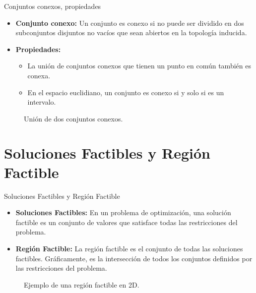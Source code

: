 \documentclass{beamer}
\begin{document}
\begin{frame}{Conjuntos conexos, propiedades}
    \begin{itemize}
        \item \textbf{Conjunto conexo:} Un conjunto es conexo si no puede ser dividido en dos subconjuntos disjuntos no vacíos que sean abiertos en la topología inducida.
        \item \textbf{Propiedades:}
        \begin{itemize}
            \item La unión de conjuntos conexos que tienen un punto en común también es conexa.
            \item En el espacio euclidiano, un conjunto es conexo si y solo si es un intervalo.
        \end{itemize}
    \end{itemize}
    
    \begin{figure}
        \centering
        \caption{Unión de dos conjuntos conexos.}
    \end{figure}
\end{frame}

\section{Soluciones Factibles y Región Factible}

\begin{frame}{Soluciones Factibles y Región Factible}
    \begin{itemize}
        \item \textbf{Soluciones Factibles:} En un problema de optimización, una solución factible es un conjunto de valores que satisface todas las restricciones del problema.
        \item \textbf{Región Factible:} La región factible es el conjunto de todas las soluciones factibles. Gráficamente, es la intersección de todos los conjuntos definidos por las restricciones del problema.
    \end{itemize}
    
    \begin{figure}
        \centering
        \caption{Ejemplo de una región factible en 2D.}
    \end{figure}
\end{frame}
\end{document}
